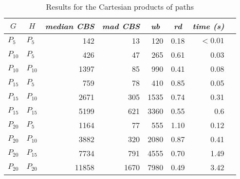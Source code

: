 \documentclass{scrartcl}
\theoremstyle{plain}
\newcommand{\cbs}{CBS}
\begin{document}
\begin{table}[!ht]
	\centering
	\scriptsize
	\begin{tabular}{|ll|rr|r|r|r|r|} 
	\hline
	\multicolumn{1}{|c}{$G$} &
	\multicolumn{1}{c|}{$H$} &
	\multicolumn{1}{c}{\emph{median \cbs{}}} &
	\multicolumn{1}{c|}{\emph{mad \cbs{}}} &
	\multicolumn{1}{c|}{\emph{ub}} &
	\multicolumn{1}{c|}{\emph{rd}} &
	\multicolumn{1}{c|}{\emph{time (s)}} \\ \hline
		
	\makeatletter{}$P_{5}$ & $P_{5}$ & 142 & 13 & 120 & 0.18 & $<0.01$ \\ 
$P_{10}$ & $P_{5}$ & 426 & 47 & 265 & 0.61 & 0.03 \\ 
$P_{10}$ & $P_{10}$ & 1397 & 85 & 990 & 0.41 & 0.08 \\ 
$P_{15}$ & $P_{5}$ & 759 & 78 & 410 & 0.85 & 0.05 \\ 
$P_{15}$ & $P_{10}$ & 2671 & 305 & 1535 & 0.74 & 0.31 \\ 
$P_{15}$ & $P_{15}$ & 5199 & 621 & 3360 & 0.55 & 0.6 \\ 
$P_{20}$ & $P_{5}$ & 1164 & 77 & 555 & 1.10 & 0.12 \\ 
$P_{20}$ & $P_{10}$ & 3882 & 320 & 2080 & 0.87 & 0.41 \\ 
$P_{20}$ & $P_{15}$ & 7734 & 791 & 4555 & 0.70 & 1.49 \\ 
$P_{20}$ & $P_{20}$ & 11858 & 1670 & 7980 & 0.49 & 3.42 \\ 
 
	
	\hline
	\end{tabular}
	\caption{\label{tab:cart_pp_perf}Results for the Cartesian products of 
paths}

\end{table}
\end{document}
